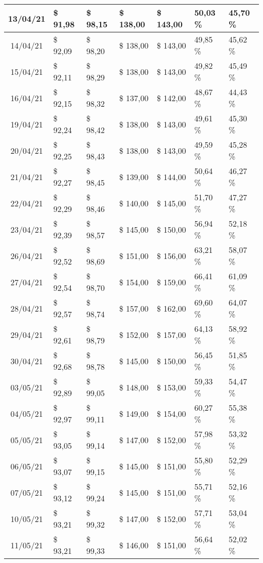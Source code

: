 \begin{center}
\begin{longtable}{|c|p{1.5cm}|p{1.5cm}|p{1.5cm}|p{1.5cm}|p{1.5cm}|p{1.5cm}|}
13/04/21 & \$ 91,98 & \$ 98,15 & \$ 138,00 & \$ 143,00 & 50,03 \% & 45,70 \% \\ \hline
14/04/21 & \$ 92,09 & \$ 98,20 & \$ 138,00 & \$ 143,00 & 49,85 \% & 45,62 \% \\ \hline
15/04/21 & \$ 92,11 & \$ 98,29 & \$ 138,00 & \$ 143,00 & 49,82 \% & 45,49 \% \\ \hline
16/04/21 & \$ 92,15 & \$ 98,32 & \$ 137,00 & \$ 142,00 & 48,67 \% & 44,43 \% \\ \hline
19/04/21 & \$ 92,24 & \$ 98,42 & \$ 138,00 & \$ 143,00 & 49,61 \% & 45,30 \% \\ \hline
20/04/21 & \$ 92,25 & \$ 98,43 & \$ 138,00 & \$ 143,00 & 49,59 \% & 45,28 \% \\ \hline
21/04/21 & \$ 92,27 & \$ 98,45 & \$ 139,00 & \$ 144,00 & 50,64 \% & 46,27 \% \\ \hline
22/04/21 & \$ 92,29 & \$ 98,46 & \$ 140,00 & \$ 145,00 & 51,70 \% & 47,27 \% \\ \hline
23/04/21 & \$ 92,39 & \$ 98,57 & \$ 145,00 & \$ 150,00 & 56,94 \% & 52,18 \% \\ \hline
26/04/21 & \$ 92,52 & \$ 98,69 & \$ 151,00 & \$ 156,00 & 63,21 \% & 58,07 \% \\ \hline
27/04/21 & \$ 92,54 & \$ 98,70 & \$ 154,00 & \$ 159,00 & 66,41 \% & 61,09 \% \\ \hline
28/04/21 & \$ 92,57 & \$ 98,74 & \$ 157,00 & \$ 162,00 & 69,60 \% & 64,07 \% \\ \hline
29/04/21 & \$ 92,61 & \$ 98,79 & \$ 152,00 & \$ 157,00 & 64,13 \% & 58,92 \% \\ \hline
30/04/21 & \$ 92,68 & \$ 98,78 & \$ 145,00 & \$ 150,00 & 56,45 \% & 51,85 \% \\ \hline
03/05/21 & \$ 92,89 & \$ 99,05 & \$ 148,00 & \$ 153,00 & 59,33 \% & 54,47 \% \\ \hline
04/05/21 & \$ 92,97 & \$ 99,11 & \$ 149,00 & \$ 154,00 & 60,27 \% & 55,38 \% \\ \hline
05/05/21 & \$ 93,05 & \$ 99,14 & \$ 147,00 & \$ 152,00 & 57,98 \% & 53,32 \% \\ \hline
06/05/21 & \$ 93,07 & \$ 99,15 & \$ 145,00 & \$ 151,00 & 55,80 \% & 52,29 \% \\ \hline
07/05/21 & \$ 93,12 & \$ 99,24 & \$ 145,00 & \$ 151,00 & 55,71 \% & 52,16 \% \\ \hline
10/05/21 & \$ 93,21 & \$ 99,32 & \$ 147,00 & \$ 152,00 & 57,71 \% & 53,04 \% \\ \hline
11/05/21 & \$ 93,21 & \$ 99,33 & \$ 146,00 & \$ 151,00 & 56,64 \% & 52,02 \% \\ \hline

\end{longtable}
\end{center}
